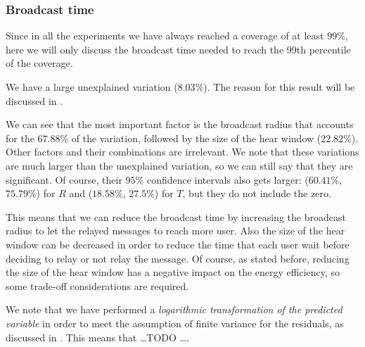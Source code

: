 \subsubsection{Broadcast time}\label{subsubsec:hd2krtime}

Since in all the experiments we have always reached a coverage of at least
\(99\%\), here we will only discuss the broadcast time needed to reach the 99th
percentile of the coverage.

We have a large unexplained variation (\(8.03\%\)). The reason for this result
will be discussed in .

We can see that the most important factor is the broadcast radius that accounts
for the \(67.88\%\) of the variation, followed by the size of the hear window
(\(22.82\%\)). Other factors and their combinations are irrelevant. We note that
these variations are much larger than the unexplained variation, so we can still
say that they are significant. Of course, their \(95\%\) confidence intervals
also gets larger: (\(60.41\%\), \(75.79\%\)) for \(R\) and (\(18.58\%\),
\(27.5\%\)) for \(T\), but they do not include the zero.

This means that we can reduce the broadcast time by increasing the broadcast
radius to let the relayed messages to reach more user. Also the size of the hear
window can be decreased in order to reduce the time that each user wait before
deciding to relay or not relay the message. Of course, as stated before,
reducing the size of the hear window has a negative impact on the energy
efficiency, so some trade-off considerations are required.

We note that we have performed a \emph{logarithmic transformation of the
predicted variable}  in order to meet the
assumption of finite variance for the residuals, as discussed in
. This means that \ldots TODO \ldots.
